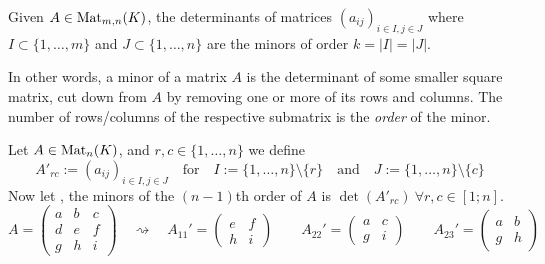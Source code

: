 \begin{definition}[Minor]
   Given \(A \in \operatorname{Mat}_{m,n}(K)\), the determinants of matrices \((a_{ij})_{i \in I, j \in J}\) where \(I \subset \{1, \ldots, m\}\) and \(J \subset \{1, \ldots, n\}\) are the minors of order \(k = |I| = |J|\).
\end{definition}
\begin{remark}
   In other words, a minor of a matrix \(A\) is the determinant of some smaller square matrix, cut down from \(A\) by removing one or more of its rows and columns.
   The number of rows/columns of the respective submatrix is the \textit{order} of the minor.
\end{remark}
\begin{example}
   Let \(A \in \operatorname{Mat}_n(K)\), and \(r, c \in \{1, \ldots, n\}\) we define
   \begin{equation}\label{eq:sliced_mat}
      A'_{rc} := (a_{ij})_{i \in I, j \in J} \quad\text{for}\quad I := \{1, \ldots, n\} \setminus \{r\} \quad\text{and}\quad J := \{1, \ldots, n\} \setminus \{c\}
   \end{equation}
   Now let \(\), the minors of the \((n-1)\)th order of \(A\) is \(\det(A'_{rc})~\forall r, c \in [1;n]\).
   \[A = \begin{pmatrix}a&b&c\\d&e&f\\g&h&i\end{pmatrix} \quad\rightsquigarrow\quad A_{11}' = \begin{pmatrix}e&f\\h&i\end{pmatrix} \qquad A_{22}' = \begin{pmatrix}a&c\\g&i\end{pmatrix} \qquad A_{23}' = \begin{pmatrix}a&b\\g&h\end{pmatrix}\]
\end{example}

